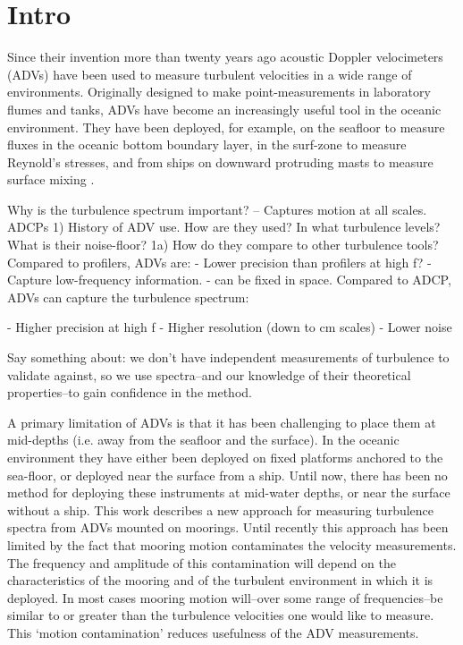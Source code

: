 \section{Intro}

Since their invention more than twenty years ago acoustic Doppler velocimeters (ADVs) have been used to measure turbulent velocities in a wide range of environments. Originally designed to make point-measurements in laboratory flumes and tanks, ADVs have become an increasingly useful tool in the oceanic environment. They have been deployed, for example, on the seafloor to measure fluxes in the oceanic bottom boundary layer, in the surf-zone to measure Reynold's stresses, and from ships on downward protruding masts to measure surface mixing \citep[e.g.]{Lohrmann++1994, Voulgaris+Trowbridge1998, Kim++2000, Trowbridge+Elgar2003, Elgar++2005, Geyer++2008}.

Why is the turbulence spectrum important? -- Captures motion at all scales.
ADCPs 
1) History of ADV use. How are they used? In what turbulence levels? What is their noise-floor? 
1a) How do they compare to other turbulence tools?
Compared to profilers, ADVs are:
  - Lower precision than profilers at high f?
  - Capture low-frequency information.
  - can be fixed in space.
Compared to ADCP, ADVs can capture the turbulence spectrum:

  - Higher precision at high f
  - Higher resolution (down to cm scales)
  - Lower noise

Say something about: we don't have independent measurements of turbulence to validate against, so we use spectra--and our knowledge of their theoretical properties--to gain confidence in the method.

A primary limitation of ADVs is that it has been challenging to place them at mid-depths (i.e. away from the seafloor and the surface). In the oceanic environment they have either been deployed on fixed platforms anchored to the sea-floor, or deployed near the surface from a ship.  Until now, there has been no method for deploying these instruments at mid-water depths, or near the surface without a ship.  This work describes a new approach for measuring turbulence spectra from ADVs mounted on moorings. Until recently this approach has been limited by the fact that mooring motion contaminates the velocity measurements.  The frequency and amplitude of this contamination will depend on the characteristics of the mooring and of the turbulent environment in which it is deployed. In most cases mooring motion will--over some range of frequencies--be similar to or greater than the turbulence velocities one would like to measure. This `motion contamination' reduces usefulness of the ADV measurements. 

